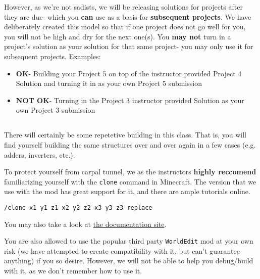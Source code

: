 \documentclass{article}
\begin{document}
However, as we're not sadists, we will be releasing solutions for projects after they are due- which you \textbf{can} use as a basis for \textbf{subsequent projects}. We have deliberately created this model so that if one project does not go well for you, you will not be high and dry for the next one(s). You \textbf{may not} turn in a project's solution as your solution for that same project- you may only use it for subsequent projects. Examples:

\begin{itemize}
  \item \textbf{OK}- Building your Project 5 on top of the instructor provided Project 4 Solution and turning it in as your own Project 5 submission
  \item \textbf{NOT OK}- Turning in the Project 3 instructor provided Solution as your own Project 3 submission
\end{itemize}

\subsection{\selectfont{Clone}}

There will certainly be some repetetive building in this class. That is, you will find yourself building the same structures over and over again in a few cases (e.g. adders, inverters, etc.). 

To protect yourself from carpal tunnel, we as the instructors \textbf{highly reccomend} familiarizing yourself with the \texttt{clone} command in Minecraft. The version that we use with the mod has great support for it, and there are ample tutorials online.

\begin{tcolorbox}
  \texttt{/clone x1 y1 z1 x2 y2 z2    x3 y3 z3    replace}
\end{tcolorbox}

You may also take a look at  \href{https://minecraft.gamepedia.com/Commands/clone}{the documentation site}.

You are also allowed to use the popular third party \texttt{WorldEdit} mod at your own risk (we have attempted to create compatibility with it, but can't guarantee anything) if you so desire. However, we will not be able to help you debug/build with it, as we don't remember how to use it.

\subsection{\selectfont{Mods \& Hall of Fame}}
\end{document}
